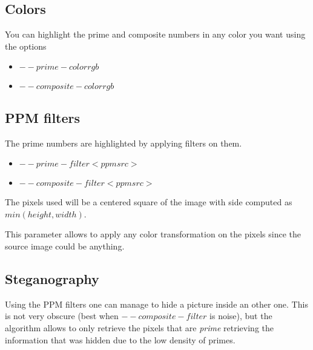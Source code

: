 \subsection{Colors}
You can highlight the prime and composite numbers in any color you want using the options

\begin{itemize}
	\item{$--prime-color r g b$}
	\item{$--composite-color r g b$}
\end{itemize}

\subsection{PPM filters}
The prime numbers are highlighted by applying filters on them.

\begin{itemize}
	\item{$--prime-filter <ppm src>$}
	\item{$--composite-filter <ppm src>$}
\end{itemize}

The pixels used will be a centered square of the image with side computed as $min(height, width)$.

This parameter allows to apply any color transformation on the pixels since the source image could be anything.


\subsection{Steganography}
Using the PPM filters one can manage to hide a picture inside an other one. This is not very obscure (best when $--composite-filter$ is noise), but the algorithm allows to only retrieve the pixels that are \emph{prime} retrieving the information that was hidden due to the low density of primes.


